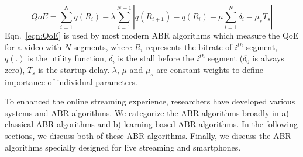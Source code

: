 \begin{equation}
\label{eqn:QoE}
QoE = \sum_{i=1}^N q(R_i) - \lambda\sum_{i=1}^{N-1}\left|q(R_{i+1})-q(R_i) - \mu\sum_{i=1}^N \delta_i - \mu_s T_s\right|
\end{equation}
Eqn.~\ref{eqn:QoE} is used by most modern ABR algorithms which measure the QoE for a video with $N$ segments, where $R_i$ represents the bitrate of $i^{th}$ segment, $q(.)$ is the utility function, $\delta_i$ is the stall before the $i^{th}$ segment ($\delta_0$ is always zero), $T_s$ is the startup delay. $\lambda$, $\mu$ and $\mu_s$ are constant weights to define importance of individual parameters.

To enhanced the online streaming experience, researchers have developed various systems and ABR algorithms. We categorize the ABR algorithms broadly in a) classical ABR algorithms and b) learning based ABR algorithms. In the following sections, we discuss both of these ABR algorithms. Finally, we discuss the ABR algorithms specially designed for live streaming and smartphones.

